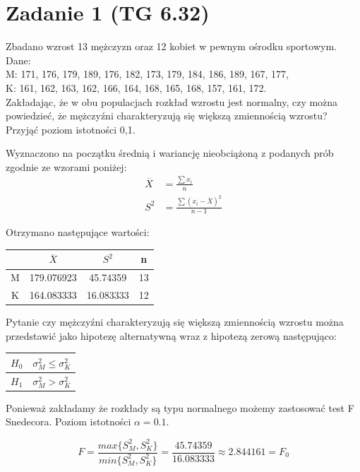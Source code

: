 \documentclass{article}
\begin{document}
\section{Zadanie 1 (TG 6.32)}
Zbadano wzrost 13 mężczyzn oraz 12 kobiet w pewnym ośrodku sportowym. Dane: \\
M: 171, 176, 179, 189, 176, 182, 173, 179, 184, 186, 189, 167, 177, \\
K: 161, 162, 163, 162, 166, 164, 168, 165, 168, 157, 161, 172. \\
Zakładając, że w obu populacjach rozkład wzrostu jest normalny, czy można powiedzieć, że mężczyźni charakteryzują się większą zmiennością wzrostu? Przyjąć poziom istotności 0,1. \\ \par

Wyznaczono na początku średnią i wariancję nieobciążoną z podanych prób zgodnie ze wzorami poniżej:
\begin{align*}
\overline{X} & = \frac{\sum x_i}{n} \\
S^2 &= \frac{\sum (x_i - \overline{X})^2 }{n-1}
\end{align*}

Otrzymano następujące wartości:
\begin{center} \begin{tabular}{|c|c|c|c|} \hline
 & $\overline{X}$ & $S^2$ & n \\ \hline
M & 179.076923 & 45.74359 & 13\\ \hline
K & 164.083333 & 16.083333 & 12\\ \hline
\end{tabular} \end{center}

Pytanie czy mężczyźni charakteryzują się większą zmiennością wzrostu można przedstawić jako hipotezę alternatywną wraz z hipotezą zerową następująco:
\begin{center} \begin{tabular}{|c|c|} \hline
$H_0$ & $\sigma^2_M \leq \sigma^2_K$ \\ \hline
$H_1$ & $\sigma^2_M > \sigma^2_K$ \\ \hline
\end{tabular} \end{center}
Ponieważ zakładamy że rozkłady są typu normalnego możemy zastosować test F Snedecora. Poziom istotności $\alpha = 0.1$.

\[ F = \frac{max\{S_M^2, S_K^2\}}{min\{S_M^2, S_K^2\}} = \frac{45.74359}{16.083333} \approx 2.844161 = F_0 \]
\end{document}
